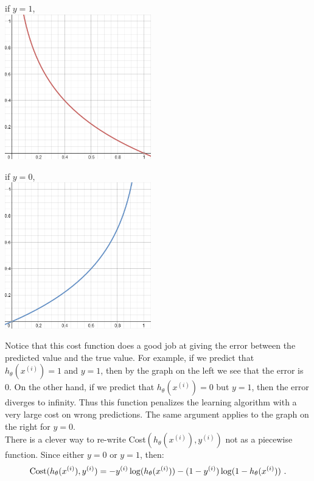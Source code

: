 \documentclass[11pt,a4paper,oneside]{report}
\begin{document}
\begin{minipage}{3in}
{\small if $y=1$, \\}
\includegraphics[width=2.5in]{yis1.png}\\
\end{minipage}
\begin{minipage}{3in}
{\small if $y=0$, \\}
\includegraphics[width=2.5in]{yis0.png}\\
\end{minipage}

Notice that this cost function does a good job at giving the error between the predicted value and the true value. For example, if we predict that $h_{\theta} (x^{(i)}) = 1$ and $y = 1$, then by the graph on the left we see that the error is 0. On the other hand, if we predict that $h_{\theta} (x^{(i)}) = 0$ but $y = 1$, then the error diverges to infinity. Thus this function penalizes the learning algorithm with a very large cost on wrong predictions. The same argument applies to the graph on the right for $y=0$.\\

There is a clever way to re-write Cost$(h_{\theta} (x^{(i)}), y^{(i)})$ not as a piecewise function. Since either $y=0$ or $y=1$, then:
\[
\textnormal{Cost}(h_{\theta} (x^{(i)}), y^{(i)}) = 
-y^{(i)}\log(h_{\theta} (x^{(i)})) -(1 - y^{(i)})\log(1 - h_{\theta} (x^{(i)})) 
\textnormal{ .}
\]
\end{document}
